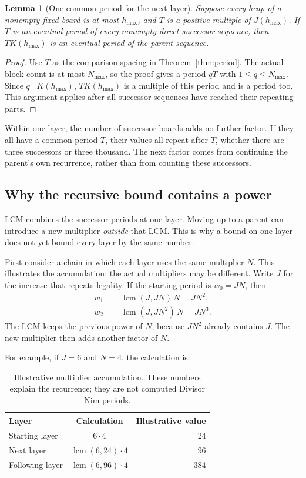 \documentclass[11pt]{article}
\newtheorem{lemma}[theorem]{Lemma}
\begin{document}
\begin{lemma}[One common period for the next layer]
\label{lem:commonlayer}
Suppose every heap of a nonempty fixed board is at most
$h_{\max}$, and $T$ is a positive multiple of $J(h_{\max})$.
If $T$ is an eventual period of every nonempty direct-successor
sequence, then $T K(h_{\max})$ is an eventual period of the
parent sequence.
\end{lemma}
\begin{proof}
Use $T$ as the comparison spacing in
Theorem~\ref{thm:period}. The actual block count is at most
$N_{\max}$, so the proof gives a period $qT$ with
$1\le q\le N_{\max}$. Since $q\mid K(h_{\max})$,
$T K(h_{\max})$ is a multiple of this period and is a period
too. This argument applies after all successor sequences have
reached their repeating parts.
\end{proof}

Within one layer, the number of successor boards adds no further
factor. If they all have a common period $T$, their values all
repeat after $T$, whether there are three successors or three
thousand. The next factor comes from continuing the parent's
own recurrence, rather than from counting these successors.

\subsection{Why the recursive bound contains a power}

LCM combines the successor periods at one layer. Moving up to a
parent can introduce a new multiplier \emph{outside} that LCM.
This is why a bound on one layer does not yet bound every layer
by the same number.

First consider a chain in which each layer uses the same multiplier
$N$. This illustrates the accumulation; the actual multipliers
may be different. Write $J$ for the increase that repeats legality.
If the starting period is $w_0=JN$, then
\[
 \begin{aligned}
 w_1&=\operatorname{lcm}(J,JN)\,N=JN^2,\\
 w_2&=\operatorname{lcm}(J,JN^2)\,N=JN^3.
 \end{aligned}
\]
The LCM keeps the previous power of $N$, because $JN^2$ already
contains $J$. The new multiplier then adds another factor of $N$.

For example, if $J=6$ and $N=4$, the calculation is:

\begin{table}[H]
\centering
\begin{tabular}{@{}l c r@{}}
\toprule
Layer & Calculation & Illustrative value \\
\midrule
Starting layer & $6\cdot4$ & $24$ \\
\addlinespace[6pt]
Next layer & $\operatorname{lcm}(6,24)\cdot4$ & $96$ \\
\addlinespace[6pt]
Following layer & $\operatorname{lcm}(6,96)\cdot4$ & $384$ \\
\bottomrule
\end{tabular}
\caption{Illustrative multiplier accumulation. These numbers
explain the recurrence; they are not computed Divisor Nim periods.}
\label{tab:layerillustration}
\end{table}
\end{document}
